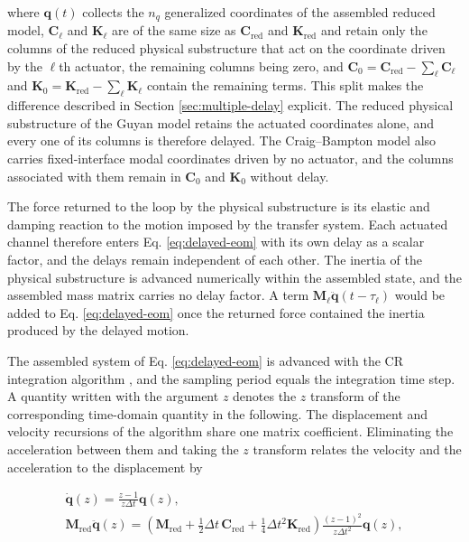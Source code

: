 \documentclass[a4paper,fleqn,review,12pt]{cas-sc}
\begin{document}
\noindent where \(\bm{q}(t)\) collects the \(n_{q}\) generalized coordinates of the assembled reduced model, \(\mathbf{C}_{\ell}\) and \(\mathbf{K}_{\ell}\) are of the same size as \(\mathbf{C}_{\mathrm{red}}\) and \(\mathbf{K}_{\mathrm{red}}\) and retain only the columns of the reduced physical substructure that act on the coordinate driven by the \(\ell\)th actuator, the remaining columns being zero, and \(\mathbf{C}_{0}=\mathbf{C}_{\mathrm{red}}-\sum_{\ell}\mathbf{C}_{\ell}\) and \(\mathbf{K}_{0}=\mathbf{K}_{\mathrm{red}}-\sum_{\ell}\mathbf{K}_{\ell}\) contain the remaining terms. This split makes the difference described in Section \ref{sec:multiple-delay} explicit. The reduced physical substructure of the Guyan model retains the actuated coordinates alone, and every one of its columns is therefore delayed. The Craig--Bampton model also carries fixed-interface modal coordinates driven by no actuator, and the columns associated with them remain in \(\mathbf{C}_{0}\) and \(\mathbf{K}_{0}\) without delay.

The force returned to the loop by the physical substructure is its elastic and damping reaction to the motion imposed by the transfer system. Each actuated channel therefore enters Eq. \eqref{eq:delayed-eom} with its own delay as a scalar factor, and the delays remain independent of each other. The inertia of the physical substructure is advanced numerically within the assembled state, and the assembled mass matrix carries no delay factor. A term \(\mathbf{M}_{\ell}\ddot{\bm{q}}(t-\tau_{\ell})\) would be added to Eq. \eqref{eq:delayed-eom} once the returned force contained the inertia produced by the delayed motion.

The assembled system of Eq. \eqref{eq:delayed-eom} is advanced with the CR integration algorithm \cite{ChenCR2008}, and the sampling period equals the integration time step. A quantity written with the argument \(z\) denotes the \(z\) transform of the corresponding time-domain quantity in the following. The displacement and velocity recursions of the algorithm share one matrix coefficient. Eliminating the acceleration between them and taking the \(z\) transform relates the velocity and the acceleration to the displacement by

\vspace{-3.5em}
\begin{equation}
	\begin{gathered}
		\dot{\bm{q}}(z)=\frac{z-1}{z\Delta t}\bm{q}(z),\\
		\mathbf{M}_{\mathrm{red}}\ddot{\bm{q}}(z)=
		\left(\mathbf{M}_{\mathrm{red}}
		+\tfrac{1}{2}\Delta t\,\mathbf{C}_{\mathrm{red}}
		+\tfrac{1}{4}\Delta t^{2}\mathbf{K}_{\mathrm{red}}\right)
		\frac{(z-1)^{2}}{z\Delta t^{2}}\bm{q}(z),
	\end{gathered}
	\label{eq:z-derivatives}
\end{equation}
\vspace{-2.5em}
\end{document}
